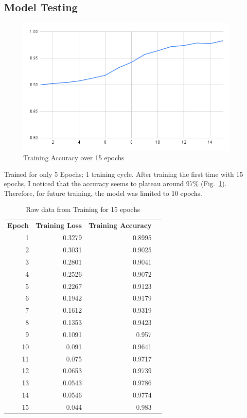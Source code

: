 \documentclass[10pt]{article}
\begin{document}
\subsection{Model Testing}

\begin{figure}
    \centering
    \includegraphics[width=1\linewidth]{images/Training Accuracy over 15 epochs.png}
    \caption{Training Accuracy over 15 epochs}
    \label{fig:Training_Accuracy}
\end{figure}

Trained for only 5 Epochs; 1 training cycle. After training the first time with 15 epochs, I noticed that the accuracy seems to plateau around 97\% (Fig.~\ref{fig:Training_Accuracy}). Therefore, for future training, the model was limited to 10 epochs.

\begin{table} [H]
    \centering
    \begin{tabular}{rrrl}
    \multicolumn{1}{c}{\textbf{Epoch}} & \multicolumn{1}{c}{\textbf{Training Loss}} & \multicolumn{1}{c}{\textbf{Training Accuracy}} &  \\
    1  & 0.3279 & 0.8995 &  \\
    2  & 0.3031 & 0.9025 &  \\
    3  & 0.2801 & 0.9041 &  \\
    4  & 0.2526 & 0.9072 &  \\
    5  & 0.2267 & 0.9123 &  \\
    6  & 0.1942 & 0.9179 &  \\
    7  & 0.1612 & 0.9319 &  \\
    8  & 0.1353 & 0.9423 &  \\
    9  & 0.1091 & 0.957  &  \\
    10 & 0.091  & 0.9641 &  \\
    11 & 0.075  & 0.9717 &  \\
    12 & 0.0653 & 0.9739 &  \\
    13 & 0.0543 & 0.9786 &  \\
    14 & 0.0546 & 0.9774 &  \\
    15 & 0.044  & 0.983  & 
    \end{tabular}
    \caption{Raw data from Training for 15 epochs}
    \label{tab:training_raw_data}
\end{table}
\end{document}
